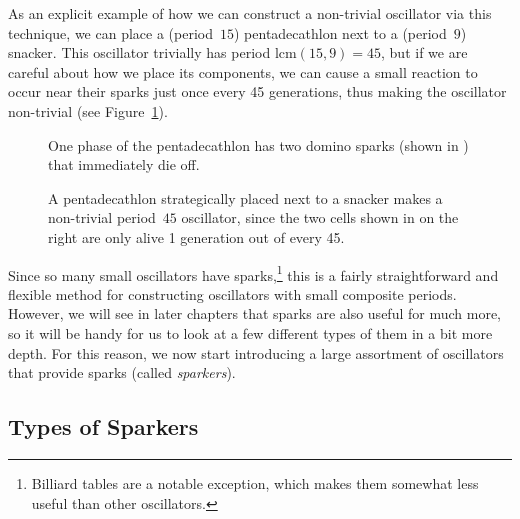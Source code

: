 As an explicit example of how we can construct a non-trivial oscillator via this technique, we can place a (period~$15$) pentadecathlon next to a (period~$9$) snacker. This oscillator trivially has period $\mathrm{lcm}(15,9) = 45$, but if we are careful about how we place its components, we can cause a small reaction to occur near their sparks just once every 45 generations, thus making the oscillator non-trivial (see Figure~\ref{fig:pentadecathlon_on_snacker}).

\begin{figure}[!htb]
	\centering
	\begin{minipage}[b]{.35\textwidth}
		\centering
		\caption{One phase of the pentadecathlon has two domino sparks (shown in ) that immediately die off.}\label{fig:pentadecathlon_spark}
	\end{minipage} \hfill %
	\begin{minipage}[b]{.61\textwidth}
		\centering{}
		\caption{A pentadecathlon strategically placed next to a snacker makes a non-trivial period~$45$ oscillator, since the two cells shown in  on the right are only alive 1 generation out of every 45.}\label{fig:pentadecathlon_on_snacker}
	\end{minipage}
\end{figure}

Since so many small oscillators have sparks,\footnote{Billiard tables are a notable exception, which makes them somewhat less useful than other oscillators.} this is a fairly straightforward and flexible method for constructing oscillators with small composite periods. However, we will see in later chapters that sparks are also useful for much more, so it will be handy for us to look at a few different types of them in a bit more depth. For this reason, we now start introducing a large assortment of oscillators that provide sparks (called \emph{sparkers}).


\subsection{Types of Sparkers}\label{sec:sparkers}

